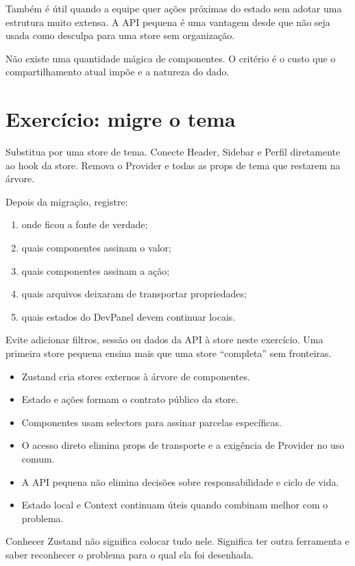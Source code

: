 Também é útil quando a equipe quer ações próximas do estado sem adotar uma
estrutura muito extensa. A API pequena é uma vantagem desde que não seja usada
como desculpa para uma store sem organização.

Não existe uma quantidade mágica de componentes. O critério é o custo que o
compartilhamento atual impõe e a natureza do dado.

\section{Exercício: migre o tema}

\begin{tarefa}
Substitua  por uma store de tema. Conecte Header, Sidebar e
Perfil diretamente ao hook da store. Remova o Provider e todas as props de tema
que restarem na árvore.
\end{tarefa}

Depois da migração, registre:

\begin{enumerate}
  \item onde ficou a fonte de verdade;
  \item quais componentes assinam o valor;
  \item quais componentes assinam a ação;
  \item quais arquivos deixaram de transportar propriedades;
  \item quais estados do DevPanel devem continuar locais.
\end{enumerate}


Evite adicionar filtros, sessão ou dados da API à store neste exercício. Uma
primeira store pequena ensina mais que uma store ``completa'' sem fronteiras.

\begin{resumo}
\begin{itemize}
  \item Zustand cria stores externos à árvore de componentes.
  \item Estado e ações formam o contrato público da store.
  \item Componentes usam selectors para assinar parcelas específicas.
  \item O acesso direto elimina props de transporte e a exigência de Provider
    no uso comum.
  \item A API pequena não elimina decisões sobre responsabilidade e ciclo de
    vida.
  \item Estado local e Context continuam úteis quando combinam melhor com o
    problema.
\end{itemize}
\end{resumo}

Conhecer Zustand não significa colocar tudo nele. Significa ter outra ferramenta
e saber reconhecer o problema para o qual ela foi desenhada.
